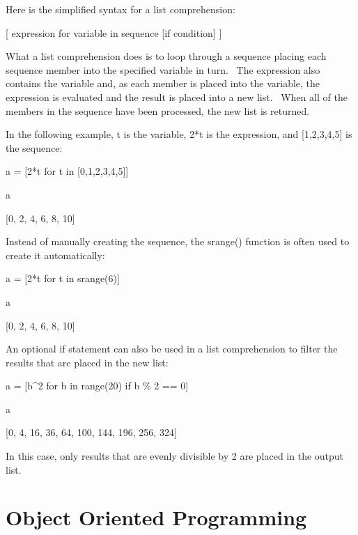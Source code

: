 \documentclass[12pt,twoside]{book}
\begin{document}
\bigskip

Here is the simplified syntax for a list comprehension:


\bigskip

[ expression for variable in sequence [if condition] ]


\bigskip

What a list comprehension does is to loop through a sequence placing
each sequence member into the specified variable in turn. \ The
expression also contains the variable and, as each member is placed
into the variable, the expression is evaluated and the result is placed
into a new list. \ When all of the members in the sequence have been
processed, the new list is returned.



In the following example, t is the variable, 2*t is the expression, and
[1,2,3,4,5] is the sequence:


\bigskip

a = [2*t for t in [0,1,2,3,4,5]]

a

{\textbar}

[0, 2, 4, 6, 8, 10]

Instead of manually creating the sequence, the srange() function is
often used to create it automatically:


\bigskip

a = [2*t for t in srange(6)]

a

{\textbar}

[0, 2, 4, 6, 8, 10]

An optional if statement can also be used in a list comprehension to
filter the results that are placed in the new list:


\bigskip

a = [b\^{}2 for b in range(20) if b \% 2 == 0]

a

{\textbar}

[0, 4, 16, 36, 64, 100, 144, 196, 256, 324]

In this case, only results that are evenly divisible by 2 are placed in
the output list.


\bigskip


\bigskip


\bigskip

\chapter[Object Oriented Programming]{Object Oriented
Programming}
\end{document}
